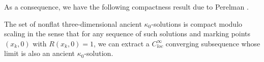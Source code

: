 As a consequence, we have the following compactness result due to
Perelman \cite{P1}.

\begin{corollary}
  \label{cor:cz-ancient-kappa-solution-compactness}
 The set of
nonflat three-dimensional ancient $\kappa_0$-solutions is compact
modulo scaling in the sense that for any sequence of such
solutions and marking points $(x_k,0)$ with $R(x_k,0)=1$, we can
extract a $C^\infty_{loc}$ converging subsequence whose limit is
also an ancient $\kappa_0$-solution.
\end{corollary}

